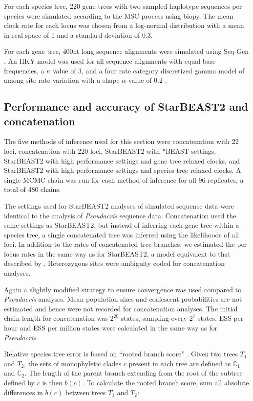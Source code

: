 \documentclass[12pt]{article}
\begin{document}
For each species tree, 220 gene trees with two sampled haplotype sequences per
species were simulated according to the MSC process using biopy. The mean clock
rate for each locus was chosen from a log-normal distribution with a mean in
real space of 1 and a standard deviation of 0.3.

For each gene tree, 400nt long sequence alignments were simulated using Seq-Gen
\citep{Rambaut01061997}. An HKY model was used for all sequence alignments with
equal base frequencies, a $\kappa$ value of 3, and a four rate category
discretized gamma model of among-site rate variation with a shape $\alpha$ value
of 0.2 \citep{Yang1994}.

\subsection{Performance and accuracy of StarBEAST2 and concatenation}

The five methods of inference used for this section were concatenation with 22
loci, concatenation with 220 loci, StarBEAST2 with *BEAST settings, StarBEAST2
with high performance settings and gene tree relaxed clocks, and StarBEAST2 with
high performance settings and species tree relaxed clocks. A single MCMC chain was
run for each method of inference for all 96 replicates, a total of 480 chains.

The settings used for StarBEAST2 analyses of simulated sequence data were
identical to the analysis of \textit{Pseudacris} sequence data. Concatenation
used the same settings as StarBEAST2, but instead of inferring each gene tree
within a species tree, a single concatenated tree was inferred using the
likelihoods of all loci. In addition to the rates of concatenated tree branches,
we estimated the per-locus rates in the same way as for StarBEAST2, a model
equivalent to that described by \cite{Rasmussen01122007}. Heterozygous sites
were ambiguity coded for concatenation analyses.

Again a slightly modified strategy to ensure convergence was used compared to
\textit{Pseudacris} analyses. Mean population sizes and coalescent probabilities
are not estimated and hence were not recorded for concatenation analyses. The
initial chain length for concatenation was $2^{20}$ states, sampling every
$2^{7}$ states. ESS per hour
and ESS per million states were calculated in the same way as for
\textit{Pseudacris}.

Relative species tree error is based on ``rooted branch score''
\citep[RBS;][]{Heled2013}. Given two trees $T_1$ and $T_2$, the sets of
monophyletic clades $c$ present in each tree are defined as $\mathbb{C}_1$ and
$\mathbb{C}_2$. The length of the parent branch extending from the root of the
subtree defined by $c$ is then $b(c)$. To calculate the rooted branch score, sum
all absolute differences in $b(c)$ between trees $T_1$ and $T_2$:
\end{document}
